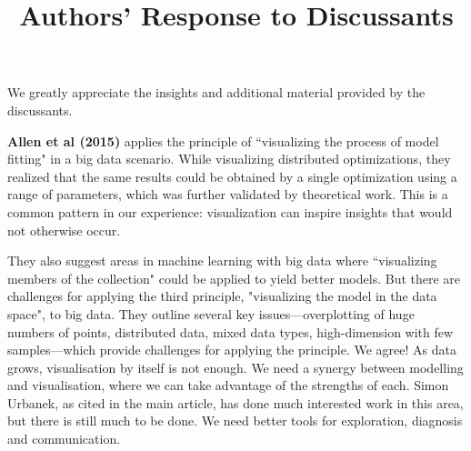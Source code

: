 \documentclass[preprint]{imsart}
\begin{document}
\begin{frontmatter}
\title{Authors' Response to Discussants}
\end{frontmatter}

We greatly appreciate the insights and additional material provided by the discussants.


\textbf{Allen et al (2015)} applies the principle of ``visualizing the process of model fitting" in a big data scenario. While visualizing distributed optimizations, they realized that the same results could be obtained by a single optimization using a range of parameters, which was further validated by theoretical work. This is a common pattern in our experience: visualization can inspire insights that would not otherwise occur.

They also suggest areas in machine learning with big data where ``visualizing members of the collection" could be applied to yield better models. But there are challenges for applying the third principle, "visualizing the model in the data space", to big data. They outline several key issues---overplotting of huge numbers of points, distributed data, mixed data types, high-dimension with few samples---which provide challenges for applying the principle. We agree! As data grows, visualisation by itself is not enough. We need a synergy between modelling and visualisation, where we can take advantage of the strengths of each. Simon Urbanek, as cited in the main article, has done much interested work in this area, but there is still much to be done. We need better tools for exploration, diagnosis and communication.
\end{document}
